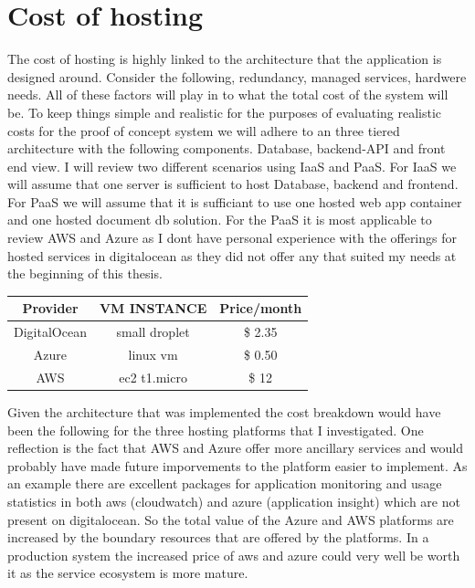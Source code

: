 \documentclass[]{uiophd}
\begin{document}
\section{Cost of hosting}
The cost of hosting is highly linked to the architecture that the application is designed around. Consider the following, redundancy, managed services, hardwere needs. All of these factors will play in to what the total cost of the system will be. To keep things simple and realistic for the purposes of evaluating realistic costs for the proof of concept system we will adhere to an three tiered architecture with the following components. Database, backend-API and front end view. I will review two different scenarios using IaaS and PaaS. For IaaS we will assume that one server is sufficient to host Database, backend and frontend. For PaaS we will assume that it is sufficiant to use one hosted web app container and one hosted document db solution. For the PaaS it is most applicable to review AWS and Azure as I dont have personal experience with the offerings for hosted services in digitalocean as they did not offer any that suited my needs at the beginning of this thesis.

\begin{center}
 \begin{tabular}{||c | c | c ||} 
 \hline
 Provider & VM INSTANCE & Price/month \\ [0.5ex] 
 \hline\hline
 DigitalOcean & small droplet & \$ 2.35 \\ 
 \hline
 Azure & linux vm &\$ 0.50 \\
 \hline
 AWS & ec2 t1.micro &\$ 12 \\
 \hline
\end{tabular}
\end{center}

Given the architecture that was implemented the cost breakdown would have been the following for the three hosting platforms that I investigated. One reflection is the fact that AWS and Azure offer more ancillary services and would probably have made future imporvements to the platform easier to implement. As an example there are excellent packages for application monitoring and usage statistics in both aws (cloudwatch) and azure (application insight) which are not present on digitalocean. So the total value of the Azure and AWS platforms are increased by the boundary resources that are offered by the platforms. In a production system the increased price of aws and azure could very well be worth it as the service ecosystem is more mature. 
\end{document}
